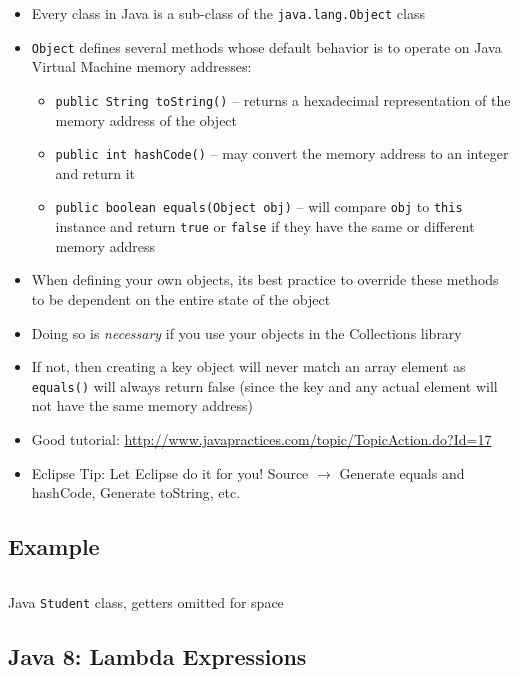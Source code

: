 \begin{itemize}
  \item Every class in Java is a sub-class of the \texttt{java.lang.Object} class
  \item \texttt{Object} defines several methods whose default behavior is to operate on Java Virtual Machine memory addresses:
    \begin{itemize}
      \item \texttt{public String toString()} -- returns a hexadecimal representation of the memory address of the object
      \item \texttt{public int hashCode()} -- may convert the memory address to an integer and return it
      \item \texttt{public boolean equals(Object obj)} -- will compare \texttt{obj} to \texttt{this} instance and return \texttt{true} or \texttt{false} if they have the same or different memory address
    \end{itemize}
  \item When defining your own objects, its best practice to override these methods to be dependent on the entire state of the object
  \item Doing so is \emph{necessary} if you use your objects in the Collections library
  \item If not, then creating a key object will never match an array element as \texttt{equals()} will always return false (since the key and any actual element will not have the same memory address)
  \item Good tutorial: \url{http://www.javapractices.com/topic/TopicAction.do?Id=17}
  \item Eclipse Tip: Let Eclipse do it for you!  Source $\rightarrow$ Generate equals and hashCode, Generate toString, etc.
\end{itemize}

\subsection{Example}

\begin{listing}[H]
\inputminted[fontsize=\scriptsize]{java}{Student.java}
\caption{Java \texttt{Student} class, getters omitted
for space}
\end{listing}

\subsection{Java 8: Lambda Expressions}


